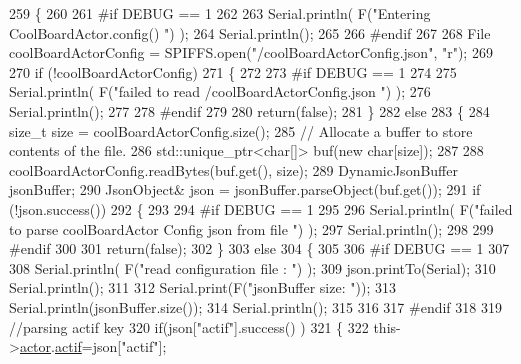 \begin{DoxyCode}
259 \{
260 
261 \textcolor{preprocessor}{#if DEBUG == 1 }
262 
263     Serial.println( F(\textcolor{stringliteral}{"Entering CoolBoardActor.config() "}) );
264     Serial.println();
265 
266 \textcolor{preprocessor}{#endif}
267 
268     File coolBoardActorConfig = SPIFFS.open(\textcolor{stringliteral}{"/coolBoardActorConfig.json"}, \textcolor{stringliteral}{"r"});
269 
270     \textcolor{keywordflow}{if} (!coolBoardActorConfig) 
271     \{
272 
273 \textcolor{preprocessor}{    #if DEBUG == 1 }
274 
275         Serial.println( F(\textcolor{stringliteral}{"failed to read /coolBoardActorConfig.json "}) );
276         Serial.println();
277 
278 \textcolor{preprocessor}{    #endif}
279 
280         \textcolor{keywordflow}{return}(\textcolor{keyword}{false});
281     \}
282     \textcolor{keywordflow}{else}
283     \{
284         \textcolor{keywordtype}{size\_t} size = coolBoardActorConfig.size();
285         \textcolor{comment}{// Allocate a buffer to store contents of the file.}
286         std::unique\_ptr<char[]> buf(\textcolor{keyword}{new} \textcolor{keywordtype}{char}[size]);
287 
288         coolBoardActorConfig.readBytes(buf.get(), size);
289         DynamicJsonBuffer jsonBuffer;
290         JsonObject& json = jsonBuffer.parseObject(buf.get());
291         \textcolor{keywordflow}{if} (!json.success()) 
292         \{
293         
294 \textcolor{preprocessor}{        #if DEBUG == 1 }
295 
296             Serial.println( F(\textcolor{stringliteral}{"failed to parse coolBoardActor Config  json from file "}) );
297             Serial.println();
298 
299 \textcolor{preprocessor}{        #endif}
300 
301             \textcolor{keywordflow}{return}(\textcolor{keyword}{false});
302         \} 
303         \textcolor{keywordflow}{else}
304         \{ 
305         
306 \textcolor{preprocessor}{        #if DEBUG == 1 }
307 
308             Serial.println( F(\textcolor{stringliteral}{"read configuration file : "}) );
309             json.printTo(Serial);
310             Serial.println();
311 
312             Serial.print(F(\textcolor{stringliteral}{"jsonBuffer size: "}));
313             Serial.println(jsonBuffer.size());
314             Serial.println();
315 
316         
317 \textcolor{preprocessor}{        #endif}
318   
319             \textcolor{comment}{//parsing actif key}
320             \textcolor{keywordflow}{if}(json[\textcolor{stringliteral}{"actif"}].success() )
321             \{
322                 this->\hyperlink{class_cool_board_actor_a8f190db9f7a39fddbcef7f152da970e9}{actor}.\hyperlink{struct_cool_board_actor_1_1state_a7963178c2de01ef0d2861f9f59ad6f3c}{actif}=json[\textcolor{stringliteral}{"actif"}];

\end{DoxyCode}
